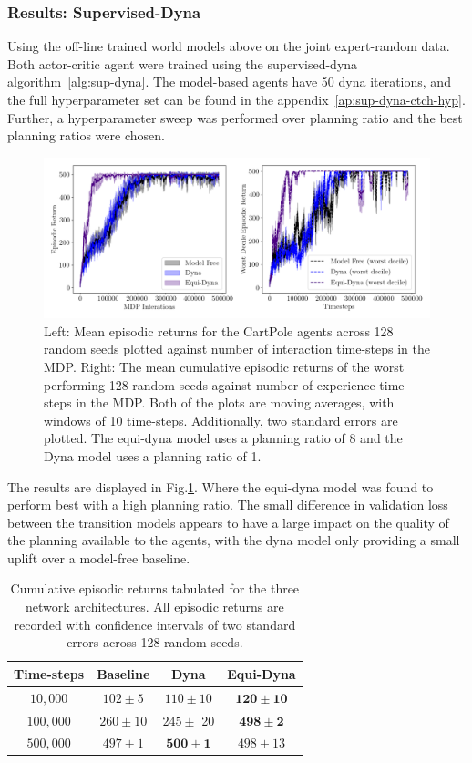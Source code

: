 \subsubsection{Results: Supervised-Dyna}
Using the off-line trained world models above on the joint expert-random data. Both actor-critic agent were trained using the supervised-dyna algorithm~\ref{alg:sup-dyna}. The model-based agents have 50 dyna iterations, and the full hyperparameter set can be found in the appendix~\ref{ap:sup-dyna-ctch-hyp}. Further, a hyperparameter sweep was performed over planning ratio and the best planning ratios were chosen.
\begin{figure}
	\centering
	\includegraphics[width=\textwidth]{Figures/Expert_dyna_cp_best.png}
	\caption{Left: Mean episodic returns for the CartPole agents across 128 random seeds
		plotted against number of interaction time-steps in the MDP. Right: The mean
		cumulative episodic returns of the worst performing 128 random seeds against
		number of experience time-steps in the MDP. Both of the plots are moving
		averages, with windows of 10 time-steps. Additionally, two standard errors are
		plotted. The equi-dyna model uses a planning ratio of 8 and the Dyna model uses a planning ratio of 1.}
	\label{fig:sup-dyna-cp}
\end{figure}
The results are displayed in Fig.\ref{fig:sup-dyna-cp}. Where the equi-dyna model was found to perform best with a high planning ratio. The small difference in validation loss between the transition models appears to have a large impact on the quality of the planning available to the agents, with the dyna model only providing a small uplift over a model-free baseline.
\begin{table}
	\centering
	\begin{tabular}{|c|c|c|c|}
		\hline
		Time-steps & Baseline     & Dyna                 & Equi-Dyna             \\
		\hline
		$10, 000$  & $102 \pm 5$  & $110 \pm 10$         & $\mathbf{120 \pm 10}$ \\
		$100, 000$ & $260 \pm 10$ & $245 \pm$ 20         & $\mathbf{498 \pm 2}$  \\
		$500,000$  & $497 \pm 1$  & $\mathbf{500 \pm 1}$ & $498 \pm 13$          \\
		\hline
	\end{tabular}
	\caption{Cumulative episodic returns tabulated for the three network architectures. All episodic returns are recorded with confidence intervals of two standard errors across 128 random seeds.}
	\label{tab:sup-dyna-cp}
\end{table}


